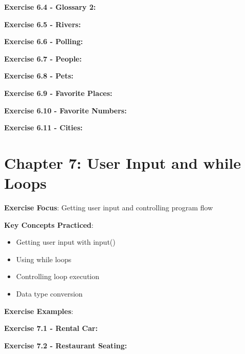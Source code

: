 \textbf{Exercise 6.4 - Glossary 2:}


\textbf{Exercise 6.5 - Rivers:}


\textbf{Exercise 6.6 - Polling:}


\textbf{Exercise 6.7 - People:}


\textbf{Exercise 6.8 - Pets:}


\textbf{Exercise 6.9 - Favorite Places:}


\textbf{Exercise 6.10 - Favorite Numbers:}


\textbf{Exercise 6.11 - Cities:}


\section*{Chapter 7: User Input and while Loops}
\textbf{Exercise Focus}: Getting user input and controlling program flow

\textbf{Key Concepts Practiced}:
\begin{itemize}
    \item Getting user input with input()
    \item Using while loops
    \item Controlling loop execution
    \item Data type conversion
\end{itemize}

\textbf{Exercise Examples}:

\textbf{Exercise 7.1 - Rental Car:}


\textbf{Exercise 7.2 - Restaurant Seating:}


